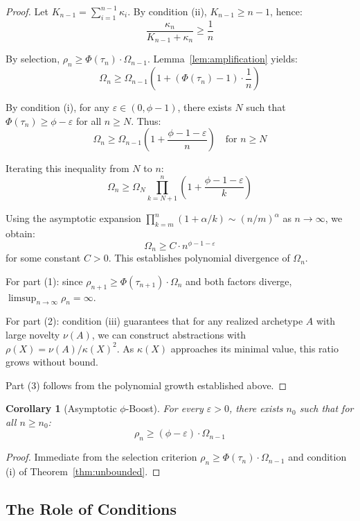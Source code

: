 \documentclass[11pt]{article}
\theoremstyle{definition}
\theoremstyle{plain}
\newtheorem{corollary}{Corollary}
\theoremstyle{remark}
\begin{document}
\begin{proof}
Let $K_{n-1} = \sum_{i=1}^{n-1} \kappa_i$. By condition (ii), $K_{n-1} \geq n-1$, hence:
\[
\frac{\kappa_n}{K_{n-1} + \kappa_n} \geq \frac{1}{n}
\]

By selection, $\rho_n \geq \Phi(\tau_n) \cdot \Omega_{n-1}$. Lemma~\ref{lem:amplification} yields:
\[
\Omega_n \geq \Omega_{n-1}\left(1 + (\Phi(\tau_n) - 1) \cdot \frac{1}{n}\right)
\]

By condition (i), for any $\varepsilon \in (0, \phi - 1)$, there exists $N$ such that $\Phi(\tau_n) \geq \phi - \varepsilon$ for all $n \geq N$. Thus:
\[
\Omega_n \geq \Omega_{n-1}\left(1 + \frac{\phi - 1 - \varepsilon}{n}\right) \quad \text{for } n \geq N
\]

Iterating this inequality from $N$ to $n$:
\[
\Omega_n \geq \Omega_N \prod_{k=N+1}^{n}\left(1 + \frac{\phi - 1 - \varepsilon}{k}\right)
\]

Using the asymptotic expansion $\prod_{k=m}^{n}(1 + \alpha/k) \sim (n/m)^{\alpha}$ as $n \to \infty$, we obtain:
\[
\Omega_n \geq C \cdot n^{\phi - 1 - \varepsilon}
\]
for some constant $C > 0$. This establishes polynomial divergence of $\Omega_n$.

For part (1): since $\rho_{n+1} \geq \Phi(\tau_{n+1}) \cdot \Omega_n$ and both factors diverge, $\limsup_{n\to\infty} \rho_n = \infty$.

For part (2): condition (iii) guarantees that for any realized archetype $A$ with large novelty $\nu(A)$, we can construct abstractions with $\rho(X) = \nu(A)/\kappa(X)^2$. As $\kappa(X)$ approaches its minimal value, this ratio grows without bound.

Part (3) follows from the polynomial growth established above.
\end{proof}

\begin{corollary}[Asymptotic $\phi$-Boost]
For every $\varepsilon > 0$, there exists $n_0$ such that for all $n \geq n_0$:
\[
\rho_n \geq (\phi - \varepsilon) \cdot \Omega_{n-1}
\]
\end{corollary}

\begin{proof}
Immediate from the selection criterion $\rho_n \geq \Phi(\tau_n) \cdot \Omega_{n-1}$ and condition (i) of Theorem~\ref{thm:unbounded}.
\end{proof}

\subsection{The Role of Conditions}
\end{document}
